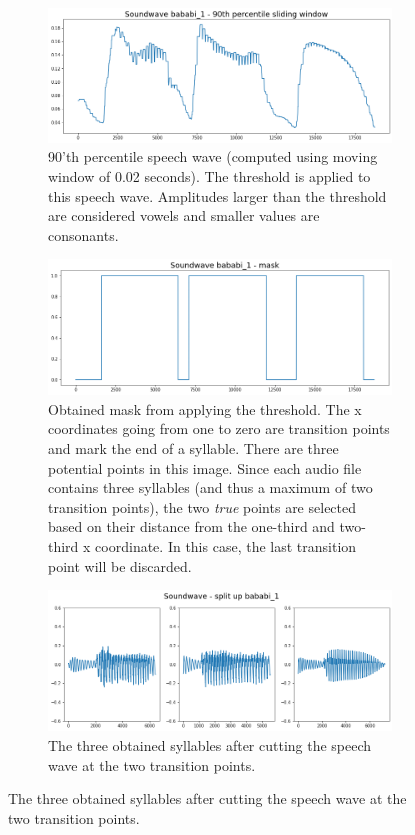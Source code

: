 \begin{appendices}
\begin{figure}
\begin{minipage}{\linewidth}
				\vspace{1em}
				
				\begin{subfigure}{\linewidth}
					\centering
					\includegraphics[width=0.5\linewidth]{screenshot013}
					\caption{90'th percentile speech wave (computed using moving window of 0.02 seconds). The threshold is applied to this speech wave. Amplitudes larger than the threshold are considered vowels and smaller values are consonants.}
					\label{fig:90th percentile}
				\end{subfigure}
			
				\vspace{1em}				
				
				\begin{subfigure}{\linewidth}
					\centering
					\includegraphics[width=0.5\linewidth]{screenshot014}
					\caption{Obtained mask from applying the threshold. The x coordinates going from one to zero are transition points and mark the end of a syllable. There are three potential points in this image. Since each audio file contains three syllables (and thus a maximum of two transition points), the two \textit{true} points are selected based on their distance from the one-third and two-third x coordinate. In this case, the last transition point will be discarded.}
					\label{fig:mask}
				\end{subfigure}
				
				\vspace{1em}
				
				\begin{subfigure}{\linewidth}
					\centering
					\includegraphics[width=0.5\linewidth]{screenshot016}
					\caption{The three obtained syllables after cutting the speech wave at the two transition points.}
					\label{fig:split up sound wave}
				\end{subfigure}
			\end{minipage}			
		\end{figure}
	




\end{appendices}
